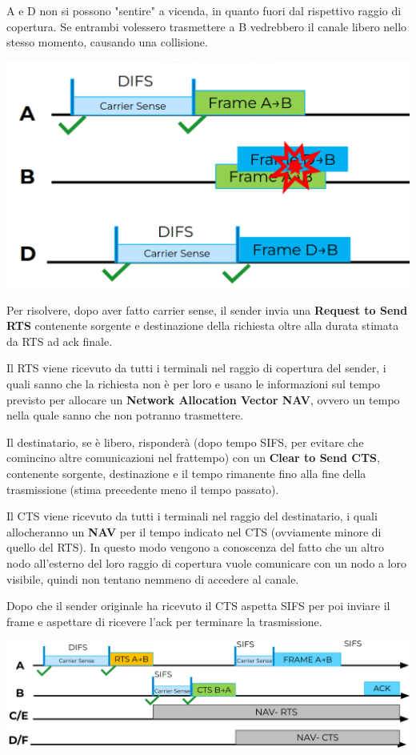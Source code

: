 A e D non si possono "sentire" a vicenda, in quanto fuori dal rispettivo raggio di copertura. Se entrambi volessero trasmettere a B vedrebbero il canale libero nello stesso momento, causando una collisione.
\begin{center}
	\includegraphics[width=0.65\linewidth]{img/wlan/boom}
\end{center}

Per risolvere, dopo aver fatto carrier sense, il sender invia una \textbf{Request to Send RTS} contenente sorgente e destinazione della richiesta oltre alla durata stimata da RTS ad ack finale.

Il RTS viene ricevuto da tutti i terminali nel raggio di copertura del sender, i quali sanno che la richiesta non è per loro e usano le informazioni sul tempo previsto per allocare un \textbf{Network Allocation Vector NAV}, ovvero un tempo nella quale sanno che non potranno trasmettere.

Il destinatario, se è libero, risponderà (dopo tempo SIFS, per evitare che comincino altre comunicazioni nel frattempo) con un \textbf{Clear to Send CTS}, contenente sorgente, destinazione e il tempo rimanente fino alla fine della trasmissione (stima precedente meno il tempo passato).

Il CTS viene ricevuto da tutti i terminali nel raggio del destinatario, i quali allocheranno un \textbf{NAV} per il tempo indicato nel CTS (ovviamente minore di quello del RTS). In questo modo vengono a conoscenza del fatto che un altro nodo all'esterno del loro raggio di copertura vuole comunicare con un nodo a loro visibile, quindi non tentano nemmeno di accedere al canale.

Dopo che il sender originale ha ricevuto il CTS aspetta SIFS per poi inviare il frame e aspettare di ricevere l'ack per terminare la trasmissione.
\begin{center}
	\includegraphics[width=0.99\linewidth]{img/wlan/rtscts}
\end{center}

